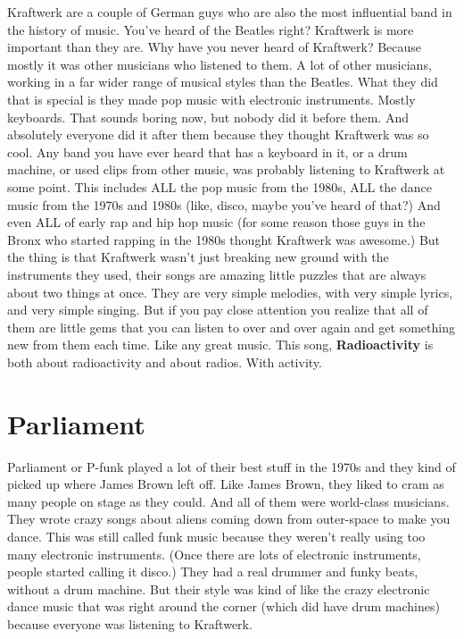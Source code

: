 \documentclass[letterpaper,12pt,single]{article}
\begin{document}
Kraftwerk are a couple of German guys who are also the most influential band in the history of music. 
You've heard of the Beatles right? 
Kraftwerk is more important than they are. 
Why have you never heard of Kraftwerk? 
Because mostly it was other musicians who listened to them. 
A lot of other musicians, working in a far wider range of musical styles than the Beatles. 
What they did that is special is they made pop music with electronic instruments. 
Mostly keyboards. 
That sounds boring now, but nobody did it before them. 
And absolutely everyone did it after them because they thought Kraftwerk was so cool. 
Any band you have ever heard that has a keyboard in it, or a drum machine, or used clips from other music, was probably listening to Kraftwerk at some point. 
This includes ALL the pop music from the 1980s, ALL the dance music from the 1970s and 1980s (like, disco, maybe you've heard of that?) 
And even ALL of early rap and hip hop music (for some reason those guys in the Bronx who started rapping in the 1980s thought Kraftwerk was awesome.) 
But the thing is that Kraftwerk wasn't just breaking new ground with the instruments they used, their songs are amazing little puzzles that are always about two things at once. 
They are very simple melodies, with very simple lyrics, and very simple singing. 
But if you pay close attention you realize that all of them are little gems that you can listen to over and over again and get something new from them each time. 
Like any great music. 
This song, \textbf{Radioactivity} is both about radioactivity and about radios. With activity.

\section{Parliament}

Parliament or P-funk played a lot of their best stuff in the 1970s and they kind of picked up where James Brown left off. 
Like James Brown, they liked to cram as many people on stage as they could. 
And all of them were world-class musicians. 
They wrote crazy songs about aliens coming down from outer-space to make you dance. 
This was still called funk music because they weren't really using too many electronic instruments.
(Once there are lots of electronic instruments, people started calling it disco.) 
They had a real drummer and funky beats, without a drum machine. 
But their style was kind of like the crazy electronic dance music that was right around the corner (which did have drum machines) because everyone was listening to Kraftwerk.
\end{document}
